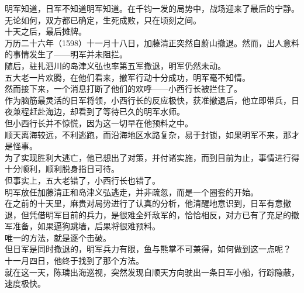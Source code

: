 \begin{multicols}{\theparacolNo}
明军知道，日军不知道明军知道。在千钧一发的局势中，战场迎来了最后的宁静。\\

无论如何，双方都已确定，生死成败，只在顷刻之间。\\

十天之后，最后摊牌。\\

万历二十六年（1598）十一月十八日，加藤清正突然自蔚山撤退。然而，出人意料的事情发生了——明军并未阻拦。\\

随后，驻扎泗川的岛津义弘也率第五军撤退，明军仍然未动。\\

五大老一片欢腾，在他们看来，撤军行动十分成功，明军毫不知情。\\

然而接下来，一个消息打断了他们的欢呼——小西行长被拦住了。\\

作为脑筋最灵活的日军将领，小西行长的反应极快，获准撤退后，他立即带兵，日夜兼程赶赴海边，却看到了等待已久的明军水师。\\

但小西行长并不惊慌，因为这一切早在他预料之中。\\

顺天离海较远，不利逃跑，而沿海地区水路复杂，易于封锁，如果明军不来，那才是怪事。\\

为了实现胜利大逃亡，他已想出了对策，并付诸实施，而到目前为止，事情进行得十分顺利，顺利脱身指日可待。\\

但事实上，五大老错了，小西行长也错了。\\

明军放任加藤清正和岛津义弘逃走，并非疏忽，而是一个圈套的开始。\\

在之前的十天里，麻贵对局势进行了认真的分析，他清醒地意识到，日军有意撤退，但凭借明军目前的兵力，是很难全歼敌军的，恰恰相反，对方已有了充足的撤军准备，如果逼狗跳墙，后果将很难预料。\\

唯一的方法，就是逐个击破。\\

但日军是同时撤退的，明军兵力有限，鱼与熊掌不可兼得，如何做到这一点呢？\\

十一月四日，他终于找到了那个方法。\\

就在这一天，陈璘出海巡视，突然发现自顺天方向驶出一条日军小船，行踪隐蔽，速度极快。\\


\end{multicols}
